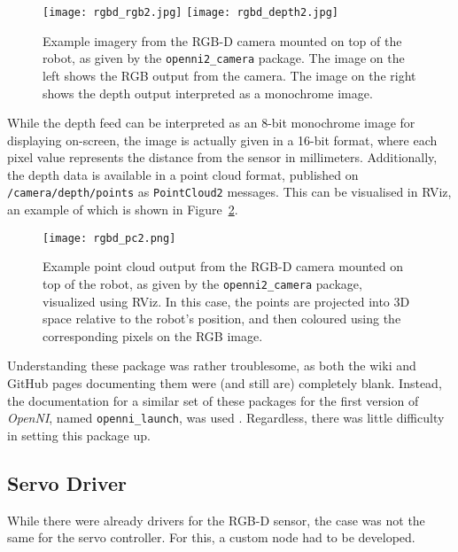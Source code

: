 \begin{figure}[h!]
    \centering
    \texttt{[image: rgbd\_rgb2.jpg]}
    \texttt{[image: rgbd\_depth2.jpg]}
    \caption{Example imagery from the RGB-D camera mounted on top of the robot, as given by the \texttt{openni2\_camera} package. The image on the left shows the RGB output from the camera. The image on the right shows the depth output interpreted as a monochrome image.}
    \label{fig:rgbd_images1}
\end{figure}

While the depth feed can be interpreted as an 8-bit monochrome image for displaying on-screen, the image is actually given in a 16-bit format, where each pixel value represents the distance from the sensor in millimeters. Additionally, the depth data is available in a point cloud format, published on \texttt{/camera/depth/points} as \texttt{PointCloud2} messages. This can be visualised in RViz, an example of which is shown in Figure~\ref{fig:rgbd_images2}.

\begin{figure}[h!]
    \centering
    \texttt{[image: rgbd\_pc2.png]}
    \caption{Example point cloud output from the RGB-D camera mounted on top of the robot, as given by the \texttt{openni2\_camera} package, visualized using RViz. In this case, the points are projected into 3D space relative to the robot's position, and then coloured using the corresponding pixels on the RGB image.}
    \label{fig:rgbd_images2}
\end{figure}

Understanding these package was rather troublesome, as both the wiki and GitHub pages documenting them were (and still are) completely blank. Instead, the documentation for a similar set of these packages for the first version of \emph{OpenNI}, named \texttt{openni\_launch}, was used \cite{ros_wiki_openni_launch}. Regardless, there was little difficulty in setting this package up.

\subsection{Servo Driver}

While there were already drivers for the RGB-D sensor, the case was not the same for the servo controller. For this, a custom node had to be developed.


